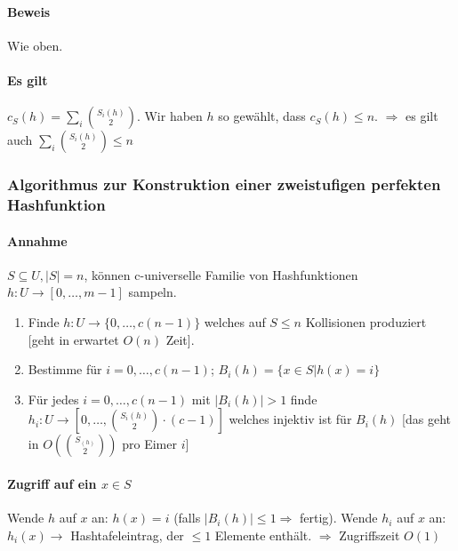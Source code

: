 \paragraph*{Beweis} Wie oben.



\paragraph*{Es gilt} $c_S(h) = \sum\limits_i {S_i(h) \choose 2}$. Wir haben $h$ so gewählt, dass $c_S(h) \leq n$.
$\Rightarrow$ es gilt auch $\sum\limits_i {S_i(h) \choose 2} \leq n$





\subsubsection{Algorithmus zur Konstruktion einer zweistufigen perfekten Hashfunktion}

\paragraph*{Annahme} $S \subseteq U, |S|=n$, können c-universelle Familie von Hashfunktionen $h: U \rightarrow [0,\dots,m-1]$ sampeln.

\begin{enumerate}
	\item Finde $h : U \rightarrow \{ 0,\dots,c(n-1) \}$ welches auf $S \leq n$ Kollisionen produziert [geht in erwartet $O(n)$ Zeit]. 
	\item Bestimme für $i=0,\dots,c(n-1)$; $B_i(h)= \{ x \in S | h(x)=i \}$
	\item Für jedes $i=0,\dots,c(n-1)$ mit $|B_i(h)|>1$ finde $h_i : U \rightarrow [0,\dots,{S_i(h) \choose 2} \cdot (c-1)]$ welches injektiv ist für $B_i(h)$ [das geht in $O({S_(h) \choose 2})$ pro Eimer $i$]
\end{enumerate}

\paragraph*{Zugriff auf ein $x \in S$} Wende $h$ auf $x$ an: $h(x)=i$ (falls $|B_i(h)| \leq 1 \Rightarrow$ fertig). Wende $h_i$ auf $x$ an: $h_i(x) \rightarrow$ Hashtafeleintrag, der $\leq 1$ Elemente enthält. $\Rightarrow$ Zugriffszeit $O(1)$

